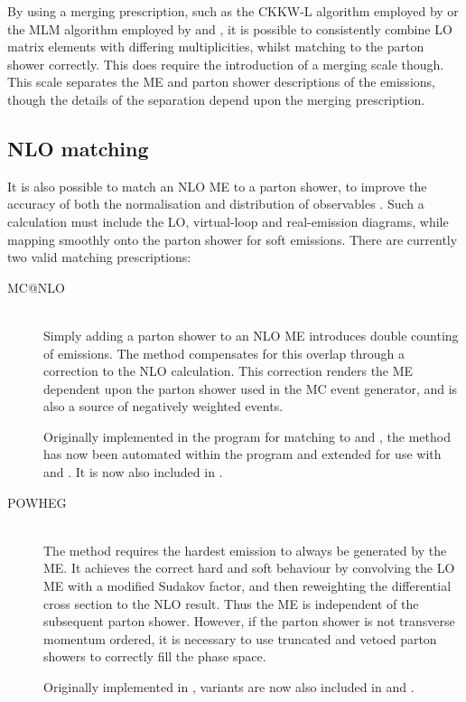 By using a merging prescription, such as the CKKW-L algorithm \cite{CKKW,Lonnblad:2002} 
employed by \sherpa or the MLM algorithm \cite{Merging} employed by \alpgen \cite{Alpgen} 
and \madgraph \cite{MadGraph}, it is possible to consistently combine LO matrix 
elements with differing multiplicities, whilst matching to the parton shower correctly. 
This does require the introduction of a merging scale though. This scale separates the 
ME and parton shower descriptions of the emissions, though the details of the 
separation depend upon the merging prescription.



\subsection{NLO matching}
\label{sec:mc:matching}

It is also possible to match an NLO ME to a parton shower, to improve the accuracy
of both the normalisation and distribution of observables \cite{Nason:2012}. Such a 
calculation must include the LO, virtual-loop and real-emission diagrams, while 
mapping smoothly onto the parton shower for soft emissions. There are currently two valid 
matching prescriptions:

\begin{description}
\item[MC@NLO] \hfill \\
	Simply adding a parton shower to an NLO ME introduces double counting of 
	emissions. The \mcatnlo method compensates for this overlap through a correction to 
	the NLO calculation. This correction renders the ME dependent upon the parton shower 
	used in the MC event generator, and is also a source of negatively weighted events.

	Originally implemented in the \mcatnlo program for matching to \fherwig 
	\cite{MCatNLO-Herwig} and \herwigpp \cite{MCatNLO-Herwig++}, the method has now been 
	automated within the \amcatnlo program \cite{aMCatNLO} and extended for use with 
	 and  \cite{MCatNLO-Pythia}. It is now also included in \sherpa.
\item[POWHEG] \hfill \\
	The \powhegmethod method requires the hardest emission to always be generated by 
	the ME. It achieves the correct hard and soft behaviour by convolving the LO
	ME with a modified Sudakov factor, and then reweighting the differential cross 
	section to the NLO result. Thus the ME is independent of the subsequent 
	parton shower. However, if the parton shower is not transverse momentum ordered, it is
	necessary to use truncated and vetoed parton showers to correctly fill the phase 
	space.

	Originally implemented in \powhegbox \cite{Powheg-method,Powheg-method2,PowhegBox}, 
	variants are now also included in \herwigpp and \sherpa.
\end{description}



